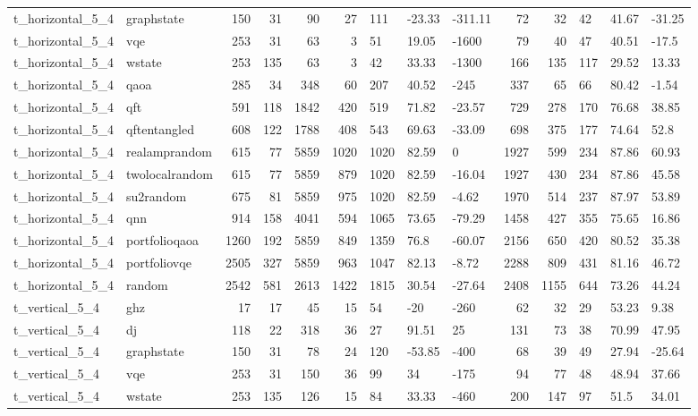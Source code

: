 \begin{longtable}{llrrrrlllrrlll}
t\_horizontal\_5\_4 & graphstate & 150 & 31 & 90 & 27 & 111 & -23.33 & -311.11 & 72 & 32 & 42 & 41.67 & -31.25 \\
t\_horizontal\_5\_4 & vqe & 253 & 31 & 63 & 3 & 51 & 19.05 & -1600 & 79 & 40 & 47 & 40.51 & -17.5 \\
t\_horizontal\_5\_4 & wstate & 253 & 135 & 63 & 3 & 42 & 33.33 & -1300 & 166 & 135 & 117 & 29.52 & 13.33 \\
t\_horizontal\_5\_4 & qaoa & 285 & 34 & 348 & 60 & 207 & 40.52 & -245 & 337 & 65 & 66 & 80.42 & -1.54 \\
t\_horizontal\_5\_4 & qft & 591 & 118 & 1842 & 420 & 519 & 71.82 & -23.57 & 729 & 278 & 170 & 76.68 & 38.85 \\
t\_horizontal\_5\_4 & qftentangled & 608 & 122 & 1788 & 408 & 543 & 69.63 & -33.09 & 698 & 375 & 177 & 74.64 & 52.8 \\
t\_horizontal\_5\_4 & realamprandom & 615 & 77 & 5859 & 1020 & 1020 & 82.59 & 0 & 1927 & 599 & 234 & 87.86 & 60.93 \\
t\_horizontal\_5\_4 & twolocalrandom & 615 & 77 & 5859 & 879 & 1020 & 82.59 & -16.04 & 1927 & 430 & 234 & 87.86 & 45.58 \\
t\_horizontal\_5\_4 & su2random & 675 & 81 & 5859 & 975 & 1020 & 82.59 & -4.62 & 1970 & 514 & 237 & 87.97 & 53.89 \\
t\_horizontal\_5\_4 & qnn & 914 & 158 & 4041 & 594 & 1065 & 73.65 & -79.29 & 1458 & 427 & 355 & 75.65 & 16.86 \\
t\_horizontal\_5\_4 & portfolioqaoa & 1260 & 192 & 5859 & 849 & 1359 & 76.8 & -60.07 & 2156 & 650 & 420 & 80.52 & 35.38 \\
t\_horizontal\_5\_4 & portfoliovqe & 2505 & 327 & 5859 & 963 & 1047 & 82.13 & -8.72 & 2288 & 809 & 431 & 81.16 & 46.72 \\
t\_horizontal\_5\_4 & random & 2542 & 581 & 2613 & 1422 & 1815 & 30.54 & -27.64 & 2408 & 1155 & 644 & 73.26 & 44.24 \\
t\_vertical\_5\_4 & ghz & 17 & 17 & 45 & 15 & 54 & -20 & -260 & 62 & 32 & 29 & 53.23 & 9.38 \\
t\_vertical\_5\_4 & dj & 118 & 22 & 318 & 36 & 27 & 91.51 & 25 & 131 & 73 & 38 & 70.99 & 47.95 \\
t\_vertical\_5\_4 & graphstate & 150 & 31 & 78 & 24 & 120 & -53.85 & -400 & 68 & 39 & 49 & 27.94 & -25.64 \\
t\_vertical\_5\_4 & vqe & 253 & 31 & 150 & 36 & 99 & 34 & -175 & 94 & 77 & 48 & 48.94 & 37.66 \\
t\_vertical\_5\_4 & wstate & 253 & 135 & 126 & 15 & 84 & 33.33 & -460 & 200 & 147 & 97 & 51.5 & 34.01 \\

\end{longtable}
